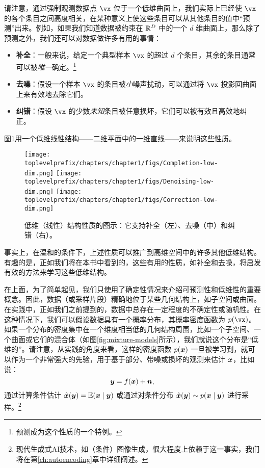 \documentclass[../../book-main_zh.tex]{subfiles}
\begin{document}
请注意，通过强制观测数据点 $\vx$ 位于一个低维曲面上，我们实际上已经使 $\vx$ 的各个条目之间高度相关，在某种意义上使这些条目可以从其他条目的值中“预测”出来。例如，如果我们知道数据被约束在 $\mathbb{R}^D$ 中的一个 $d$ 维曲面上，那么除了预测之外，我们还可以对数据做许多有用的事情：%
\begin{itemize}
    \item \textbf{补全}：一般来说，给定一个典型样本 $\vx$ 的超过 $d$ 个条目，其余的条目通常可以被{\em 唯一}确定。\footnote{预测成为这个性质的一个特例。}
    \item \textbf{去噪}：假设一个样本 $\vx$ 的条目被{\em 小}噪声扰动，可以通过将 $\vx$ 投影回曲面上来有效地去除它们。
    \item \textbf{纠错}：假设 $\vx$ 的少数{\em 未知}条目被任意损坏，它们可以被有效且高效地纠正。
\end{itemize}
图\ref{fig:low-dim-properties}用一个低维线性结构——二维平面中的一维直线——来说明这些性质。

\begin{figure}
    \centering
    \texttt{[image: \\toplevelprefix/chapters/chapter1/figs/Completion-low-dim.png]}     \texttt{[image: \\toplevelprefix/chapters/chapter1/figs/Denoising-low-dim.png]} \texttt{[image: \\toplevelprefix/chapters/chapter1/figs/Correction-low-dim.png]} 
    \caption{低维（线性）结构性质的图示：它支持补全（左）、去噪（中）和纠错（右）。}
    \label{fig:low-dim-properties}
\end{figure}

事实上，在温和的条件下，上述性质可以推广到高维空间中的许多其他低维结构\cite{Wright-Ma-2022}。有趣的是，正如我们将在本书中看到的，这些有用的性质，如补全和去噪，将启发有效的方法来学习这些低维结构。

在上面，为了简单起见，我们只使用了确定性情况来介绍可预测性和低维性的重要概念。因此，数据（或采样片段）精确地位于某些几何结构上，如子空间或曲面。在实践中，正如我们之前提到的，数据中总存在一定程度的不确定性或随机性。在这种情况下，我们可以假设数据具有一个概率分布，其概率密度函数为 $p(\vx)$。如果一个分布的密度集中在一个维度相当低的几何结构周围，比如一个子空间、一个曲面或它们的混合体（如图\ref{fig:mixture-models}所示），我们就说这个分布是“低维的”。请注意，从实践的角度来看，这样的密度函数 $p(\bm{x})$ 一旦被学习到，就可以作为一个非常强大的先验，用于基于部分、带噪或损坏的观测来估计 $\bm{x}$，比如说：
\begin{equation}
\bm{y} = f(\bm{x}) + \boldsymbol{n},
\end{equation}
通过计算条件估计 $\hat{\bm{x}}(\bm{y}) = \mathbb{E}(\bm{x} \mid \bm{y})$ 或通过对条件分布 $\hat{\bm{x}}(\bm{y}) \sim p(\bm{x}\mid \bm{y})$ 进行采样。\footnote{现代生成式AI技术，如（条件）图像生成，很大程度上依赖于这一事实，我们将在第\ref{ch:autoencoding}章中详细阐述。}
\end{document}
